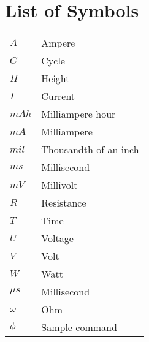 \chapter*{List of Symbols}



\begin{tabular}{ll}
    $A$
        & Ampere\\
    $C$
        & Cycle\\
    $H$
         & Height\\
    $I$
         & Current\\
    $mAh$
        & Milliampere hour\\
    $mA$
        & Milliampere\\
    $mil$
        & Thousandth of an inch\\  
    $ms$
        & Millisecond\\
    $mV$
        & Millivolt\\
    $R$
        & Resistance\\

    $T$ & Time \\

    $U$
        & Voltage\\ 
    $V$
        & Volt\\
    $W$
        & Watt\\
    $\mu s$
        & Millisecond\\
    $\omega$
        & Ohm\\
    $\phi$ 
        &Sample command\\
\end{tabular}
